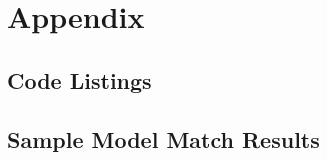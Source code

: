 \documentclass[draft,final]{thesisclass} %
\newcommand{\json}[2]{
    
}
\begin{document}
\backmatter


\printbibliography

\printindex

\printglossaries


\chapter{Appendix}
\setcounter{page}{1}
\setcounter{chapter}{0}

\section{Code Listings}


\section{Sample Model Match Results}
\json{match_result_candidate_1}{Match Result for \textit{Bao Neilan}}
\json{match_result_candidate_8}{Match Result for \textit{Emanuelle Fought}}
\end{document}
